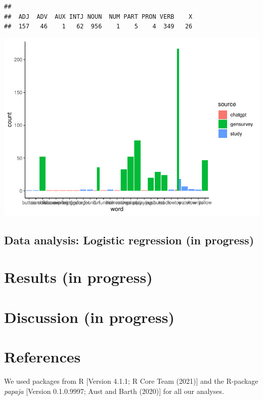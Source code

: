\documentclass[
  english,
  man]{apa6}
\begin{document}
\begin{verbatim}
## 
##  ADJ  ADV  AUX INTJ NOUN  NUM PART PRON VERB    X 
##  157   46    1   62  956    1    5    4  349   26
\end{verbatim}

\includegraphics{capstone640_files/figure-latex/unnamed-chunk-5-1.pdf}

\hypertarget{data-analysis-logistic-regression-in-progress}{%
\subsection{Data analysis: Logistic regression (in progress)}\label{data-analysis-logistic-regression-in-progress}}

\hypertarget{results-in-progress}{%
\section{Results (in progress)}\label{results-in-progress}}

\hypertarget{discussion-in-progress}{%
\section{Discussion (in progress)}\label{discussion-in-progress}}

\newpage

\hypertarget{references}{%
\section{References}\label{references}}

We used packages from R {[}Version 4.1.1; R Core Team (2021){]} and the R-package \emph{papaja} {[}Version 0.1.0.9997; Aust and Barth (2020){]} for all our analyses.
\end{document}
